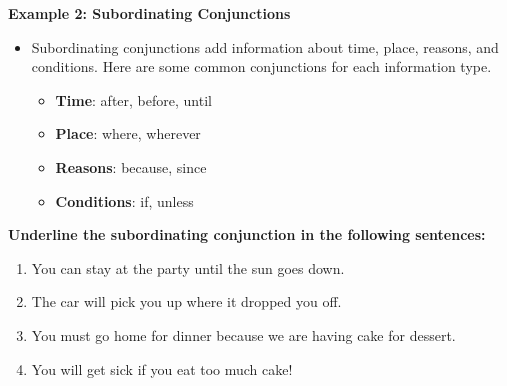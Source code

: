 \documentclass[12pt]{article}
\begin{document}
\begin{tcolorbox}[colframe=black!60, colback=white, 
coltitle=black, colbacktitle=black!15, fonttitle=\bfseries\Large, 
title=Examples, halign title=center, left=10pt, right=10pt, top=10pt, bottom=15pt]


\textbf{Example 2: Subordinating Conjunctions}
\begin{itemize}

    \item Subordinating conjunctions add information about time, place, reasons, and conditions. Here are some common conjunctions for each information type. 
    \begin{itemize}
        \item \textbf{Time}: after, before, until
         \end{itemize}
    \begin{itemize}
        \item \textbf{Place}: where, wherever
    \end{itemize}
    \begin{itemize}
        \item \textbf{Reasons}: because, since
    \end{itemize}
    \begin{itemize}
        \item \textbf{Conditions}: if, unless
    \end{itemize}
\end{itemize}

     \end{tcolorbox}

\vspace{1em}
\begin{tcolorbox}[colframe=black!60, colback=white, 
coltitle=black, colbacktitle=black!15, fonttitle=\bfseries\Large, 
title=Guided Practice, halign title=center, left=10pt, right=10pt, top=10pt, bottom=15pt]
\textbf{Underline the subordinating conjunction in the following sentences:}
\begin{enumerate}[itemsep=1em] %
    \item You can stay at the party until the sun goes down.
    \item     The car will pick you up where it dropped you off.
    \item You must go home for dinner because we are having cake for dessert.
    \item You will get sick if you eat too much cake!


\end{enumerate}
\end{tcolorbox}
\end{document}
